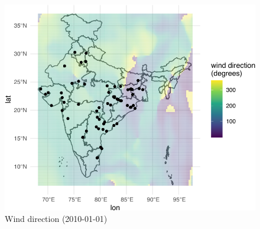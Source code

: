 \documentclass[
]{article}
\begin{document}
\begin{figure}
\centering
\includegraphics{draft_files/figure-latex/windexample-1.pdf}
\caption{\label{fig:windexample}Wind direction (2010-01-01)}
\end{figure}

\newpage
\end{document}
